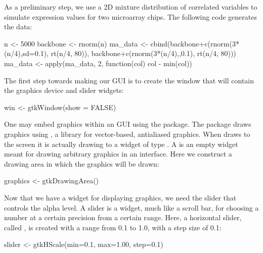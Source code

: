 \documentclass[article,shortnames]{jss}
\begin{document}
As a preliminary step, we use a 2D mixture distribution of correlated
variables to simulate expression values for two microarray chips. The
following code generates the data:
\begin{Code}
n <- 5000
backbone <- rnorm(n)
ma_data <- cbind(backbone+c(rnorm(3*(n/4),sd=0.1), rt(n/4, 80)), 
  backbone+c(rnorm(3*(n/4),,0.1), rt(n/4, 80)))
ma_data <- apply(ma_data, 2, function(col) col - min(col))
\end{Code}

The first step towards making our GUI is to create the window that
will contain the graphics device and slider widgets:
\begin{Code}
win <- gtkWindow(show = FALSE)
\end{Code}

One may embed  graphics within an  GUI using
the  \citep{cairoDevice} package. The  package draws
 graphics using  \citep{cairo}, a library for
vector-based, antialiased graphics.  When  draws to
the screen it is actually drawing to a  widget of type
. A  is an empty widget
meant for drawing arbitrary graphics in an interface. Here we
construct a drawing area in which the  graphics will be
drawn:
\begin{Code}
graphics <- gtkDrawingArea()
\end{Code}

Now that we have a widget for displaying  graphics, we
need the slider that controls the alpha level. A slider is a widget,
much like a scroll bar, for choosing a number at a certain precision
from a certain range. Here, a horizontal slider, called
, is created with a range from 0.1 to 1.0, with a
step size of 0.1:
\begin{Code}
slider <- gtkHScale(min=0.1, max=1.00, step=0.1)
\end{Code}
\end{document}
